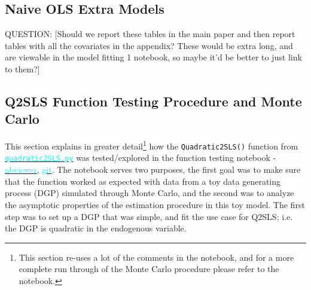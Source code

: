 \documentclass[12pt]{article}
\newcommand{\inlinecode}{\texttt}
\begin{document}


\subsection{Naive OLS Extra Models} \label{appendix_naive}

QUESTION: \textcolor{BrickRed}{[Should we report these tables in the main paper and then report tables with all the covariates in the appendix? These would be extra long, and are viewable in the model fitting 1 notebook, so maybe it'd be better to just link to them?]}

\subsection{Q2SLS Function Testing Procedure and Monte Carlo} \label{appendix_function_testing}
This section explains in greater detail\footnote{This section re-uses a lot of the comments in the notebook, and for a more complete run through of the Monte Carlo procedure please refer to the notebook.} how the \inlinecode{Quadratic2SLS()} function from \href{https://github.com/nadavtadelis/Reproducible_Metrics/blob/master/quadratic2SLS.py}{\textcolor{cyan}{\inlinecode{quadratic2SLS.py}}} was tested/explored in the function testing notebook - \href{https://nbviewer.jupyter.org/github/nadavtadelis/Reproducible_Metrics/blob/master/function_testing.ipynb}{\textcolor{cyan}{nbviewer}}, \href{https://github.com/nadavtadelis/Reproducible_Metrics/blob/master/function_testing.ipynb}{\textcolor{cyan}{git}}. The notebook serves two purposes, the first goal was to make sure that the function worked as expected with data from a toy data generating process (DGP) simulated through Monte Carlo, and the second was to analyze the asymptotic properties of the estimation procedure in this toy model. The first step was to set up a DGP that was simple, and fit the use case for Q2SLS; i.e. the DGP is quadratic in the endogenous variable.
\end{document}
